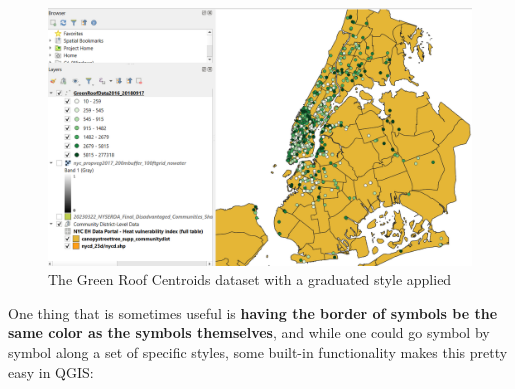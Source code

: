 \documentclass[
  letterpaper,
  DIV=11,
  numbers=noendperiod]{scrreprt}
\begin{document}
\begin{figure}

{\centering \includegraphics{./images/point_symbology_3.png}

}

\caption{The Green Roof Centroids dataset with a graduated style
applied}

\end{figure}

One thing that is sometimes useful is \textbf{having the border of
symbols be the same color as the symbols themselves}, and while one
could go symbol by symbol along a set of specific styles, some built-in
functionality makes this pretty easy in QGIS:
\end{document}
